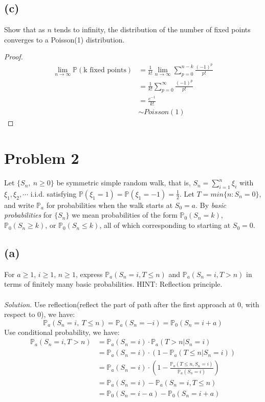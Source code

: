 \documentclass{article}
\newcommand{\prob}{\mathbb{P}}
\begin{document}
\subsection*{(c)}
Show that as $n$ tends to infinity, the distribution of the number of fixed points converges to a Poisson(1) distribution.
\color{blue}
\begin{proof}
\begin{equation*}
    \begin{split}
        \lim_{n\rightarrow \infty} \prob(\text{k fixed points}) &= \frac{1}{k!}\lim_{n \rightarrow \infty} \sum_{p=0}^{n-k}\frac{(-1)^p}{p!}\\
            &= \frac{1}{k!}\sum_{p=0}^{\infty}\frac{(-1)^p}{p!}\\
            &= \frac{e^{-1}}{k!}\\
            &\sim Poisson(1)
    \end{split}
\end{equation*}
\end{proof}
\color{black}
\section*{Problem 2}
Let $\{S_n,\ n\geq0\}$ be symmetric simple random walk, that is, $S_n=\sum_{i=1}^n\xi_i$ with $\xi_1,\xi_2,\cdots$ i.i.d. satisfying $\mathbb{P}(\xi_1=1)=\mathbb{P}(\xi_1=-1)=\frac{1}{2}$. Let $T=min\{n:S_n=0\}$, and write $\mathbb{P}_a$ for probabilities when the walk starts at $S_0=a$. By \textit{basic probabilities} for $\{S_n\}$ we mean probabilities of the form $\mathbb{P}_0(S_n=k)$, $\mathbb{P}_0(S_n\geq k)$, or $\mathbb{P}_0(S_n\leq k)$, all of which corresponding to starting at $S_0=0$.
\subsection*{(a)}
For $a\geq1$, $i\geq1$, $n\geq1$, express $\mathbb{P}_a(S_n=i,T\leq n)$ and $\mathbb{P}_a(S_n=i, T>n)$ in terms of finitely many basic probabilities. HINT: Reflection principle.
\color{blue}
\\\\
\textit{Solution.} Use reflection(reflect the part of path after the first approach at 0, with respect to 0), we have:
\begin{equation*}
    \prob_a(S_n=i,\ T\leq n) = \prob_a(S_n=-i) = \prob_0(S_n=i+a)
\end{equation*}
Use conditional probability, we have:
\begin{equation*}
\begin{split}
    \prob_a(S_n=i, T >n) &= \prob_a(S_n=i)\cdot\prob_a(T>n|S_n=i)\\
        &=\prob_a(S_n=i)\cdot(1-\prob_a(T\leq n|S_n=i))\\
        &=\prob_a(S_n=i)\cdot(1-\frac{\prob_a(T\leq n,S_n=i)}{\prob_a(S_n=i)})\\
        &=\prob_a(S_n=i)-\prob_a(S_n=i, T\leq n)\\
        &=\prob_0(S_n=i-a) -\prob_0(S_n=i+a)
\end{split}
\end{equation*}
\color{black}
\end{document}
